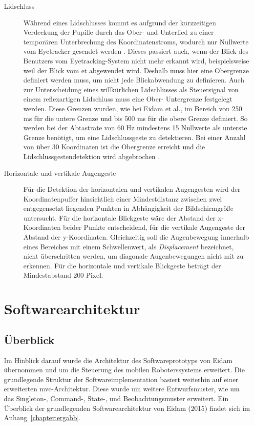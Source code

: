 \begin{description}
\item[Lidschluss] Während eines Lidschlusses kommt es aufgrund der kurzzeitigen Verdeckung der Pupille durch das Ober- und Unterlied zu einer temporären Unterbrechung des Koordinatenstroms, wodurch nur Nullwerte vom Eyetracker gesendet werden \cite{Eidam2015}. Dieses passiert auch, wenn der Blick des Benutzers vom Eyetracking-System nicht mehr erkannt wird, beispielsweise weil der Blick vom \acs{et} abgewendet wird. Deshalb muss hier eine Obergrenze definiert werden muss, um nicht jede Blickabwendung zu definieren. Auch zur Unterscheidung eines willkürlichen Lidschlusses als Steuersignal von einem reflexartigen Lidschluss muss eine Ober- \bzw Untergrenze festgelegt werden. Diese Grenzen wurden, wie bei Eidam et al., im Bereich von 250 ms für die untere Grenze und bis 500 ms für die obere Grenze definiert. So werden bei der Abtastrate von 60 Hz mindestens 15 Nullwerte als unterste Grenze benötigt, um eine Lidschlussgeste zu detektieren. Bei einer Anzahl von über 30 Koordinaten ist die Obergrenze erreicht und die Lidschlussgestendetektion wird abgebrochen \cite{Eidam2015}.

\item[Horizontale und vertikale Augengeste]
Für die Detektion der horizontalen und vertikalen Augengesten wird der Koordinatenpuffer hinsichtlich einer Mindestdistanz zwischen zwei entgegensetzt liegenden Punkten in Abhängigkeit der Bildschirmgröße untersucht. Für die horizontale Blickgeste wäre der Abstand der x-Koordinaten beider Punkte entscheidend, für die vertikale Augengeste der Abstand der y-Koordinaten. Gleichzeitig soll die Augenbewegung innerhalb eines Bereiches mit einem Schwellenwert, als \textit{Displacement} bezeichnet, nicht überschritten werden, um diagonale Augenbewegungen nicht mit zu erkennen. Für die horizontale und vertikale Blickgeste beträgt der Mindestabstand 200 Pixel.
\end{description}


\section{Softwarearchitektur}
\label{section:architektur}
\subsection{Überblick}
Im Hinblick darauf wurde die Architektur des Softwareprototyps von Eidam übernommen \cite{Eidam2015,Eidam2016} und um die Steuerung des mobilen Roboterssystems erweitert. Die grundlegende Struktur der Softwareimplementation basiert weiterhin auf einer erweiterten \acf{mvc}-Architektur. Diese wurde um weitere Entwurfsmuster, wie um das Singleton-, Command-, State-, und Beobachtungsmuster erweitert. Ein Überblick der grundlegenden Softwarearchitektur von Eidam (2015) findet sich im Anhang~\ref{chapter:ergabb}.


